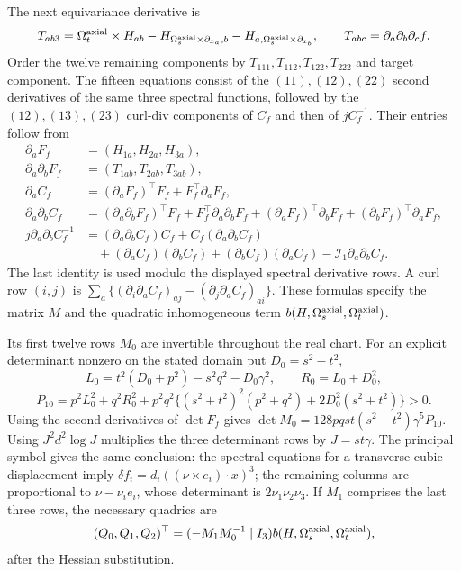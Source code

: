 \documentclass[11pt,a4paper]{article}
\numberwithin{equation}{section}
\theoremstyle{plain}
\theoremstyle{definition}
\theoremstyle{remark}
\begin{document}
The next equivariance derivative is
\begin{equation}\label{iso:rr-T}
 T_{ab3}=\Omega_t^{\rm axial}\times H_{ab}-H_{\Omega_s^{\rm axial}\times \partial_{x_a},b}-H_{a,\Omega_s^{\rm axial}\times \partial_{x_b}},
 \qquad T_{abc}=\partial_a\partial_b\partial_c f.
\end{equation}
Order the twelve remaining components by $T_{111},T_{112},T_{122},T_{222}$
and target component.  The fifteen equations consist of the $(11),(12),(22)$
second derivatives of the same three spectral functions, followed by
the $(12),(13),(23)$ curl-div components of $C_f$ and then of $jC_f^{-1}$.
Their entries follow from
\begin{align*}
 \partial_aF_f&=(H_{1a},H_{2a},H_{3a}),\\
 \partial_a\partial_bF_f&=(T_{1ab},T_{2ab},T_{3ab}),\\
 \partial_aC_f&=(\partial_aF_f)^{\top}F_f+F_f^{\top}\partial_aF_f,\\
 \partial_a\partial_bC_f&=(\partial_a\partial_bF_f)^{\top}F_f+F_f^{\top}\partial_a\partial_bF_f
                   +(\partial_aF_f)^{\top}\partial_bF_f+(\partial_bF_f)^{\top}\partial_aF_f,\\
 j\partial_a\partial_bC_f^{-1}&=(\partial_a\partial_bC_f)C_f+C_f(\partial_a\partial_bC_f)\\
 &\quad +(\partial_aC_f)(\partial_bC_f)+(\partial_bC_f)(\partial_aC_f)-\mathcal I_1\partial_a\partial_bC_f .
\end{align*}
The last identity is used modulo the displayed spectral derivative rows.
A curl row $(i,j)$ is
$\sum_a\{(\partial_i\partial_aC_f)_{aj}-(\partial_j\partial_aC_f)_{ai}\}$.
These formulas specify the matrix $M$ and the quadratic inhomogeneous term $b(H,\Omega_s^{\rm axial},\Omega_t^{\rm axial})$.

Its first twelve rows $M_0$ are invertible throughout the real chart.
For an explicit determinant nonzero on the stated domain put $D_0=s^2-t^2$,
\[
 L_0=t^2(D_0+p^2)-s^2q^2-D_0\gamma^2,\qquad R_0=L_0+D_0^2,
\]
\[
 P_{10}=p^2L_0^2+q^2R_0^2+
 p^2q^2\{(s^2+t^2)^2(p^2+q^2)+2D_0^2(s^2+t^2)\}>0.
\]
Using the second derivatives of $\det F_f$ gives
$\det M_0=128pqst(s^2-t^2)\gamma^5P_{10}$.
Using $J^2d^2\log J$ multiplies the three determinant rows by $J=st\gamma$.
The principal symbol gives the same conclusion: the spectral equations
for a transverse cubic displacement imply
$\delta f_i=d_i((\nu\times e_i)\cdot x)^3$; the remaining columns are proportional
to $\nu-\nu_ie_i$, whose determinant is $2\nu_1\nu_2\nu_3$.
If $M_1$ comprises the last three rows, the necessary quadrics are
\begin{equation}\label{iso:rr-quadrics}
 (Q_0,Q_1,Q_2)^{\top}=(-M_1M_0^{-1}\mid I_3)b(H,\Omega_s^{\rm axial},\Omega_t^{\rm axial}),
\end{equation}
after the Hessian substitution.
\end{document}

